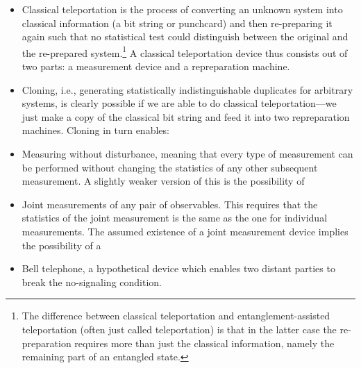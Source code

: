 \documentclass[11pt,a4paper]{article}
\theoremstyle{plain}
\theoremstyle{definition}
\theoremstyle{remark}
\numberwithin{equation}{section}
\begin{document}
\begin{itemize}
    \item Classical teleportation is the process of converting an unknown system into classical information (a bit string or punchcard) and then re-preparing it again such that no statistical test could distinguish between the original and the re-prepared system.\footnote{The difference between classical teleportation and entanglement-assisted teleportation (often just called teleportation) is that in the latter case the re-preparation requires more than just the classical information, namely the remaining part of an entangled state.} A classical teleportation device thus consists out of two parts: a measurement device and a repreparation machine.
    \item Cloning, i.e., generating statistically indistinguishable duplicates for arbitrary systems, is clearly possible if we are able to do classical teleportation---we just make a copy of the classical bit string and feed it into two repreparation machines. Cloning in turn enables:
    \item Measuring without disturbance, meaning that every type of measurement can be performed without changing the statistics of any other subsequent measurement. A slightly weaker version of this is the possibility of
    \item Joint measurements of any pair of observables. This requires that the statistics of the joint measurement is the same as the one for individual measurements. The assumed existence of a joint measurement device implies the possibility of a
    \item Bell telephone, a hypothetical device which enables two distant parties to break the no-signaling condition.
\end{itemize}
\end{document}

